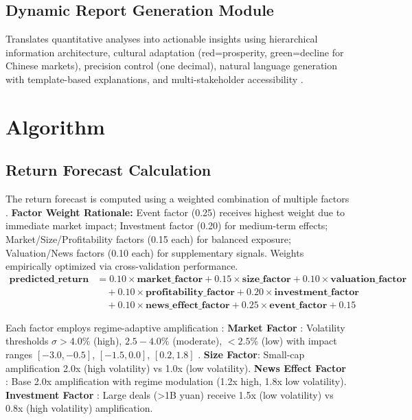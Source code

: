 \documentclass[3p,times,procedia]{elsarticle}
\begin{document}
\subsection{Dynamic Report Generation Module}

Translates quantitative analyses into actionable insights using hierarchical information architecture, cultural adaptation (red=prosperity, green=decline for Chinese markets), precision control (one decimal), natural language generation with template-based explanations, and multi-stakeholder accessibility \cite{Ribeiro2016,Harvey2016}.

\section{Algorithm}

\subsection{Return Forecast Calculation}
The return forecast is computed using a weighted combination of multiple factors \cite{FAMA1993}. \textbf{Factor Weight Rationale:} Event factor (0.25) receives highest weight due to immediate market impact; Investment factor (0.20) for medium-term effects; Market/Size/Profitability factors (0.15 each) for balanced exposure; Valuation/News factors (0.10 each) for supplementary signals. Weights empirically optimized via cross-validation performance.
\begin{align}
\mathbf{predicted\_return} &= 0.10 \times \mathbf{market\_factor} + 0.15 \times \mathbf{size\_factor} + 0.10 \times \mathbf{valuation\_factor} \nonumber \\
&\quad + 0.10 \times \mathbf{profitability\_factor} + 0.20 \times \mathbf{investment\_factor} \nonumber \\
&\quad + 0.10 \times \mathbf{news\_effect\_factor} + 0.25 \times \mathbf{event\_factor} + 0.15
\end{align}

Each factor employs regime-adaptive amplification \cite{Carhart1997}: \textbf{Market Factor} \cite{FAMA1993}: Volatility thresholds $\sigma > 4.0\%$ (high), $2.5-4.0\%$ (moderate), $<2.5\%$ (low) with impact ranges $[-3.0, -0.5]$, $[-1.5, 0.0]$, $[0.2, 1.8]$ \cite{Nelson1991}. \textbf{Size Factor}: Small-cap amplification 2.0x (high volatility) vs 1.0x (low volatility). \textbf{News Effect Factor} \cite{TETLOCK2007}: Base 2.0x amplification with regime modulation (1.2x high, 1.8x low volatility). \textbf{Investment Factor} \cite{Daniel1998}: Large deals (>1B yuan) receive 1.5x (low volatility) vs 0.8x (high volatility) amplification.
\end{document}
